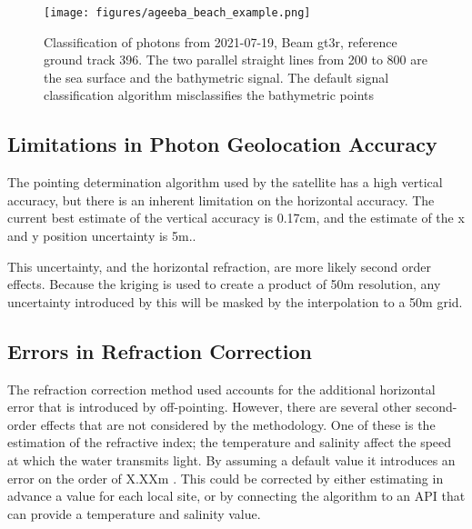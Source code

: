 \begin{figure}[htbp]
    \centering
    \texttt{[image: figures/ageeba\_beach\_example.png]}
    \caption{Classification of photons from 2021-07-19, Beam gt3r, reference ground track 396. The two parallel straight lines from 200 to 800 are the sea surface and the bathymetric signal. The default signal classification algorithm misclassifies the bathymetric points}
    \label{fig:ageeba_bad_classes}
\end{figure}



\subsection{Limitations in Photon Geolocation Accuracy}

The pointing determination algorithm used by the satellite has a high vertical accuracy, but there is an inherent limitation on the horizontal accuracy. The current best estimate of the vertical accuracy is 0.17cm, and the estimate of the x and y position uncertainty is 5m..

This uncertainty, and the horizontal refraction, are more likely second order effects. Because the kriging is used to create a product of 50m resolution, any uncertainty introduced by this will be masked by the interpolation to a 50m grid.


\subsection{Errors in Refraction Correction}

The refraction correction method used accounts for the additional horizontal error that is introduced by off-pointing. However, there are several other second-order effects that are not considered by the methodology. One of these is the estimation of the refractive index; the temperature and salinity affect the speed at which the water transmits light. By assuming a default value it introduces an error on the order of X.XXm . This could be corrected by either estimating in advance a value for each local site, or by connecting the algorithm to an API that can provide a temperature and salinity value. 

